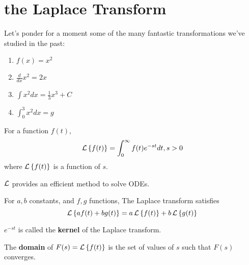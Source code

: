 \chapter{the Laplace Transform}


\begin{example}[transformations]
    Let's ponder for a moment some of the many fantastic transformations we've studied in the past:
    \begin{enumerate}
        \item $f(x) = x^2$
        \item $\frac{d}{dx}x^2 = 2x$
        \item $\int x^2 dx = \frac{1}{3}x^3 + C$
        \item $\int_{0}^{3} x^2 dx = g$
    \end{enumerate}
\end{example}

\begin{definition}
    For a function $f(t)$, $$\operatorname{\mathcal{L}}\left\{f(t)\right\} = \int_0^\infty f(t) e^{-st} dt, s>0$$
    where $\operatorname{\mathcal{L}}\left\{f(t)\right\}$ is a function of $s$.
\end{definition}

\begin{remark}
    $\operatorname{\mathcal{L}}$ provides an efficient method to solve ODEs.
\end{remark}

\begin{theorem}
    For $a,b$ constants, and $f, g$ functions, The Laplace transform satisfies
    $$\operatorname{\mathcal{L}}\left\{af(t) + bg(t)\right\} = a\operatorname{\mathcal{L}}\left\{f(t)\right\} + b\operatorname{\mathcal{L}}\left\{g(t)\right\}$$
\end{theorem}

\begin{definition}
    $e^{-st}$ is called the \textbf{kernel} of the Laplace transform.
\end{definition}

\begin{definition}
    The \textbf{domain} of $F(s) = \operatorname{\mathcal{L}}\left\{f(t)\right\}$ is the set of values of $s$ such that $F(s)$ converges.
\end{definition}

